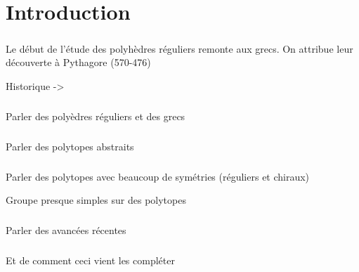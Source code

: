 \chapter*{Introduction}

\paragraph{}
Le début de l'étude des polyhèdres réguliers remonte aux grecs. On attribue leur découverte à Pythagore (570-476)

Historique ->



\paragraph{}
Parler des polyèdres réguliers et des grecs

\paragraph{}
Parler des polytopes abstraits

\paragraph{}
Parler des polytopes avec beaucoup de symétries (réguliers et chiraux)

Groupe presque simples sur des polytopes

\paragraph{}
Parler des avancées récentes

\paragraph{}
Et de comment ceci vient les compléter
